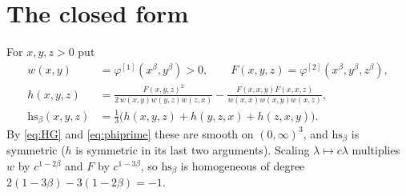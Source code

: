\documentclass[11pt]{amsart}
\theoremstyle{definition}
\numberwithin{equation}{section}
\newcommand{\hs}{\mathrm{hs}}
\begin{document}
\section{The closed form}

For $x,y,z>0$ put
\begin{align}
w(x,y)&=\varphi^{[1]}(x^\beta,y^\beta)>0,\qquad F(x,y,z)=\varphi^{[2]}(x^\beta,y^\beta,z^\beta),\\
h(x,y,z)&=\frac{F(x,y,z)^2}{2\,w(x,y)w(y,z)w(z,x)}-\frac{F(x,x,y)F(x,x,z)}{w(x,x)w(x,y)w(x,z)},\label{eq:h}\\
\hs_\beta(x,y,z)&=\tfrac13\big(h(x,y,z)+h(y,z,x)+h(z,x,y)\big).\label{eq:hs}
\end{align}
By \eqref{eq:HG} and \eqref{eq:phiprime} these are smooth on $(0,\infty)^3$, and $\hs_\beta$ is symmetric ($h$ is symmetric in its last two arguments). Scaling $\lambda\mapsto c\lambda$
multiplies $w$ by $c^{1-2\beta}$ and $F$ by $c^{1-3\beta}$, so $\hs_\beta$ is homogeneous of degree $2(1-3\beta)-3(1-2\beta)=-1$.
\end{document}
